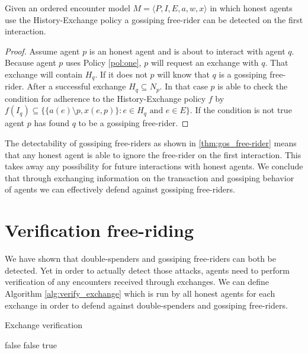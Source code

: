 \begin{thm}
    \label{thm:gos_free-rider}
    Given an ordered encounter model $M = \langle P, I, E, a, w, x \rangle$ in which honest agents use the History-Exchange policy
    a gossiping free-rider can be detected on the first interaction.
\end{thm}
\begin{proof}
    Assume agent $p$ is an honest agent and is about to interact with agent $q$. Because agent $p$
    uses Policy \ref{pol:one}, $p$ will request an exchange with $q$. That exchange will contain 
    $H_q$. If it does not $p$ will know that $q$ is a gossiping free-rider. After a successful
    exchange $H_q \subseteq N_p$. In that case $p$ is able to check the condition for adherence to 
    the History-Exchange policy $f$ by $f(I_q) \subseteq \{ \{a(e) \setminus p, x(e, p)\} : e \in 
    H_q \text{ and } e \in E\}$. If the condition is not true agent $p$ has found $q$ to be a
    gossiping free-rider.
\end{proof}

The detectability of gossiping free-riders as shown in \ref{thm:gos_free-rider} means that any 
honest agent is able to ignore the free-rider on the first interaction. This takes away any 
possibility for future interactions with honest agents. We conclude that through exchanging
information on the transaction and gossiping behavior of agents we can effectively defend against 
gossiping free-riders.

\section{Verification free-riding}
We have shown that double-spenders and gossiping free-riders can both be detected. Yet in order to 
actually detect those attacks, agents need to perform verification of any encounters received 
through exchanges. We can define Algorithm \ref{alg:verify_exchange} which is run by all 
honest agents for each exchange in order to defend against double-spenders and gossiping free-riders.

\begin{algorithm}
\caption{Exchange verification}\label{alg:verify_exchange}
\begin{algorithmic}[1]
 \Return false
\EndIf
\EndFor
{}
 \Return false
\EndIf
\EndFor
\Return true
\EndProcedure
\end{algorithmic}
\end{algorithm}

